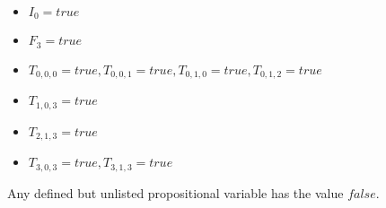 \documentclass[11pt,a4paper]{article}
\begin{document}
\begin{solution}
    \begin{itemize}
    	\item $I_0 = true$
    	\item $F_3 = true$
    	\item $T_{0, 0, 0} = true, T_{0, 0, 1} = true, T_{0, 1, 0} = true, T_{0, 1, 2} = true$
    	\item $T_{1, 0, 3} = true$
		\item $T_{2, 1, 3} = true$
		\item $T_{3, 0, 3} = true, T_{3, 1, 3} = true$
    \end{itemize}

	Any defined but unlisted propositional variable has the value $false$.
\end{solution}

\end{document}
